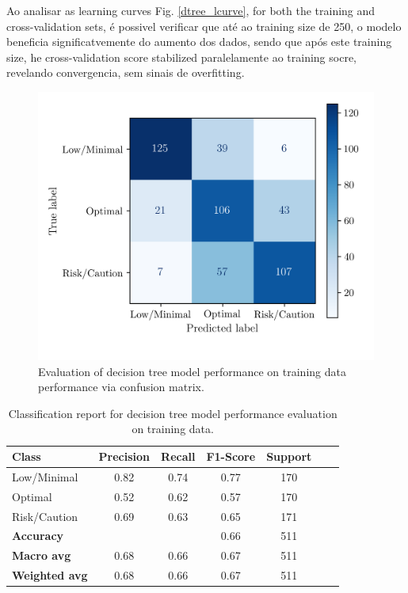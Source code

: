 \documentclass[conference]{IEEEtran}
\begin{document}
Ao analisar as learning curves {Fig. \ref{dtree_lcurve}}, for both the training and cross-validation sets, é possivel verificar que até ao training size de 250, o modelo beneficia significatvemente do aumento dos dados, sendo que após este training size, he cross-validation score stabilized paralelamente ao training socre, revelando convergencia, sem sinais de overfitting.


\begin{figure}[H]
    \centering
    \includegraphics[width=1\linewidth]{assets/DTREE_ConfusionMatrixTrain.png}
    \caption{Evaluation of decision tree model performance on training data performance via confusion matrix.}
    \label{dtree_cmtrain}
\end{figure}

\begin{table}[H]
\centering
\caption{Classification report for decision tree model performance evaluation on training data.}
\label{cr_dtree_train}
\begin{tabular}{lcccccc}
\toprule
\textbf{Class} & \textbf{Precision} & \textbf{Recall} & \textbf{F1-Score} & \textbf{Support} \\
\midrule
Low/Minimal & 0.82 & 0.74 & 0.77 & 170 \\
Optimal & 0.52 & 0.62 & 0.57 & 170 \\
Risk/Caution & 0.69 & 0.63 & 0.65 & 171 \\
\midrule
\textbf{Accuracy} &  &  & 0.66 & 511 \\
\textbf{Macro avg} & 0.68 & 0.66 & 0.67 & 511 \\
\textbf{Weighted avg} & 0.68 & 0.66 & 0.67 & 511 \\
\bottomrule
\end{tabular}
\end{table}
\end{document}
